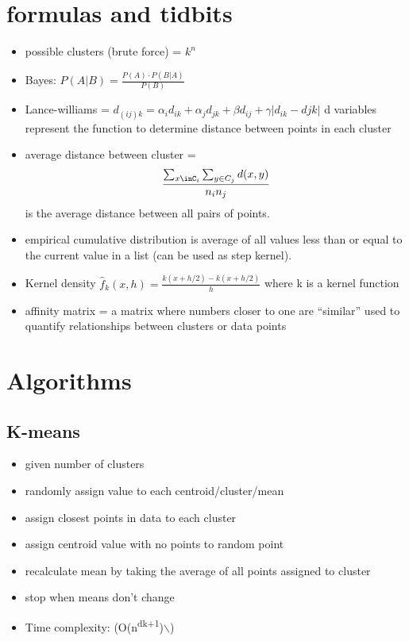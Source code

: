 \documentclass[11pt]{article}
\author{David Lewis}
\date{\today}
\title{}
\begin{document}
\section*{formulas and tidbits}
\label{sec:orgc592848}
\begin{itemize}
\item possible clusters (brute force) =  \(k^n\)
\item Bayes: \(P(A|B) = \frac{P(A) \cdot P(B|A)}{P(B)}\)
\item Lance-williams = \(d_{(ij)k} = \alpha_id_{ik} + \alpha_jd_{jk} + \beta d_{ij} + \gamma|d_{ik} -
  d{jk}|\) d variables represent the function to determine distance between
points in each cluster
\item average distance between cluster = \[\frac{\sum_{x\inC_i}\sum_{y\in
  C_j}d(x,y)}{n_in_j}\] is the average distance between all pairs of points.
\item empirical cumulative distribution is average of all values less than or equal
to the current value in a list (can be used as step kernel).
\item Kernel density \(\hat f_k(x, h) = \frac{k(x+h/2) - k(x+h/2)}{h}\) where k is a
kernel function
\item affinity matrix = a matrix where numbers closer to one are ``similar'' used to
quantify relationships between clusters or data points
\end{itemize}
\section*{Algorithms}
\label{sec:org25bcb84}
\subsection*{K-means}
\label{sec:org799a88e}
\begin{itemize}
\item given number of clusters
\item randomly assign value to each centroid/cluster/mean
\item assign closest points in data to each cluster
\item assign centroid value with no points to random point
\item recalculate mean by taking the average of all points assigned to cluster
\item stop when means don't change
\item Time complexity: (O(n\textsuperscript{dk+1})$\backslash$)
\end{itemize}
\end{document}
